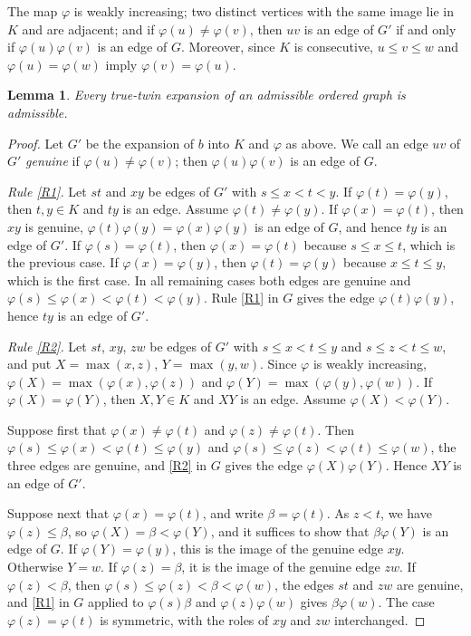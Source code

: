 \documentclass[11pt]{amsart}
\newtheorem{lemma}[theorem]{Lemma}
\theoremstyle{definition}
\theoremstyle{remark}
\numberwithin{equation}{section}
\begin{document}
The map $\varphi$ is weakly increasing; two distinct vertices with the same image lie in $K$ and are adjacent; and if $\varphi(u)\ne\varphi(v)$, then $uv$ is an edge of $G'$ if and only if $\varphi(u)\varphi(v)$ is an edge of $G$. Moreover, since $K$ is consecutive, $u\le v\le w$ and $\varphi(u)=\varphi(w)$ imply $\varphi(v)=\varphi(u)$.

\begin{lemma}\label{lem:twins}
Every true-twin expansion of an admissible ordered graph is admissible.
\end{lemma}

\begin{proof}
Let $G'$ be the expansion of $b$ into $K$ and $\varphi$ as above. We call an edge $uv$ of $G'$ \emph{genuine} if $\varphi(u)\ne\varphi(v)$; then $\varphi(u)\varphi(v)$ is an edge of $G$.

\emph{Rule \ref{R1}.} Let $st$ and $xy$ be edges of $G'$ with $s\le x<t<y$. If $\varphi(t)=\varphi(y)$, then $t,y\in K$ and $ty$ is an edge. Assume $\varphi(t)\ne\varphi(y)$. If $\varphi(x)=\varphi(t)$, then $xy$ is genuine, $\varphi(t)\varphi(y)=\varphi(x)\varphi(y)$ is an edge of $G$, and hence $ty$ is an edge of $G'$. If $\varphi(s)=\varphi(t)$, then $\varphi(x)=\varphi(t)$ because $s\le x\le t$, which is the previous case. If $\varphi(x)=\varphi(y)$, then $\varphi(t)=\varphi(y)$ because $x\le t\le y$, which is the first case. In all remaining cases both edges are genuine and $\varphi(s)\le\varphi(x)<\varphi(t)<\varphi(y)$. Rule \ref{R1} in $G$ gives the edge $\varphi(t)\varphi(y)$, hence $ty$ is an edge of $G'$.

\emph{Rule \ref{R2}.} Let $st$, $xy$, $zw$ be edges of $G'$ with $s\le x<t\le y$ and $s\le z<t\le w$, and put $X=\max(x,z)$, $Y=\max(y,w)$. Since $\varphi$ is weakly increasing, $\varphi(X)=\max(\varphi(x),\varphi(z))$ and $\varphi(Y)=\max(\varphi(y),\varphi(w))$. If $\varphi(X)=\varphi(Y)$, then $X,Y\in K$ and $XY$ is an edge. Assume $\varphi(X)<\varphi(Y)$.

Suppose first that $\varphi(x)\ne\varphi(t)$ and $\varphi(z)\ne\varphi(t)$. Then $\varphi(s)\le\varphi(x)<\varphi(t)\le\varphi(y)$ and $\varphi(s)\le\varphi(z)<\varphi(t)\le\varphi(w)$, the three edges are genuine, and \ref{R2} in $G$ gives the edge $\varphi(X)\varphi(Y)$. Hence $XY$ is an edge of $G'$.

Suppose next that $\varphi(x)=\varphi(t)$, and write $\beta=\varphi(t)$. As $z<t$, we have $\varphi(z)\le\beta$, so $\varphi(X)=\beta<\varphi(Y)$, and it suffices to show that $\beta\varphi(Y)$ is an edge of $G$. If $\varphi(Y)=\varphi(y)$, this is the image of the genuine edge $xy$. Otherwise $Y=w$. If $\varphi(z)=\beta$, it is the image of the genuine edge $zw$. If $\varphi(z)<\beta$, then $\varphi(s)\le\varphi(z)<\beta<\varphi(w)$, the edges $st$ and $zw$ are genuine, and \ref{R1} in $G$ applied to $\varphi(s)\beta$ and $\varphi(z)\varphi(w)$ gives $\beta\varphi(w)$. The case $\varphi(z)=\varphi(t)$ is symmetric, with the roles of $xy$ and $zw$ interchanged.
\end{proof}
\end{document}
